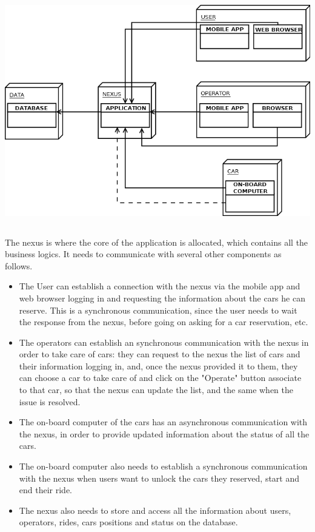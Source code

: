\documentclass{article}
\begin{document}
\begin{flushleft}
\includegraphics[width=15cm, height=10cm]{HLComponent} 


\vspace{1.5cm}
The nexus is where the core of the application is allocated, which contains all the business logics. It needs to communicate with several other components as follows.




\begin {itemize}
\item The User can establish a connection with the nexus via the mobile app and web browser logging in and requesting the information about the cars he can reserve. This is a synchronous communication, since the user needs to wait the response from the nexus, before going on asking for a car reservation, etc. 
\item The operators can establish an synchronous communication with the nexus in order to take care of cars: they can request to the nexus the list of cars and their information logging in, and, once the nexus provided it to them, they can choose a car to take care of and click on the "Operate" button associate to that car, so that the nexus can update the list, and the same when the issue is resolved.

\item The on-board computer of the cars has an asynchronous communication with the nexus, in order to provide updated information about the status of all the cars.
\item The on-board computer also needs to establish a synchronous communication with the nexus  when users want to unlock the cars they reserved, start and end their ride.
\item The nexus also needs to store and access all the information about users, operators, rides, cars positions and status on the database.
\end{itemize}


\end{flushleft}
\end{document}
